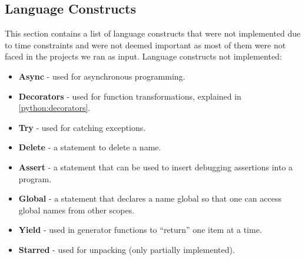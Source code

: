 \subsection{Language Constructs}
This section contains a list of language constructs that were not implemented due to time constraints and were not deemed important as most of them were not faced in the projects we ran as input.
Language constructs not implemented:
\begin{itemize}
\item \textbf{Async} - used for asynchronous programming.\cite{python_async}
\item \textbf{Decorators} - used for function transformations, explained in \cref{python:decorators}.
\item \textbf{Try} - used for catching exceptions.\cite{python_exception}
\item \textbf{Delete} - a statement to delete a name.\cite{python_delete}
\item \textbf{Assert} - a statement that can be used to insert debugging assertions into a program.\cite{python_assert}
\item \textbf{Global} - a statement that declares a name global so that one can access global names from other scopes.\cite{python_global}
\item \textbf{Yield} - used in generator functions to ``return'' one item at a time.\cite{python_yield}
\item \textbf{Starred} - used for unpacking (only partially implemented).\cite{python_unpacking}
\end{itemize}

